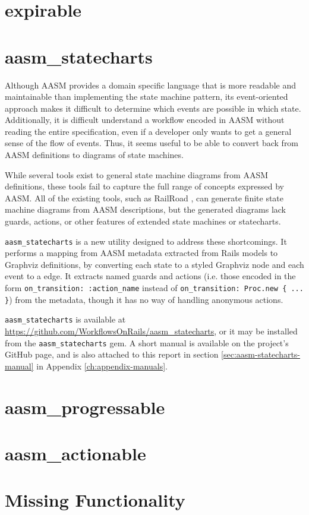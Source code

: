 \documentclass[document.tex]{subfiles}
\begin{document}
\FloatBarrier


\section {expirable}


\section {aasm\_statecharts}

Although AASM provides a domain specific language that is more readable and maintainable than implementing the state machine pattern, its event-oriented approach makes it difficult to determine which events are possible in which state. Additionally, it is difficult understand a workflow encoded in AASM without reading the entire specification, even if a developer only wants to get a general sense of the flow of events. Thus, it seems useful to be able to convert back from AASM definitions to diagrams of state machines.

While several tools exist to general state machine diagrams from AASM definitions, these tools fail to capture the full range of concepts expressed by AASM. All of the existing tools, such as RailRoad \cite{railroad}, can generate finite state machine diagrams from AASM descriptions, but the generated diagrams lack guards, actions, or other features of extended state machines or statecharts.

\verb!aasm_statecharts! is a new utility designed to address these shortcomings. It performs a mapping from AASM metadata extracted from Rails models to Graphviz \cite{graphviz} definitions, by converting each state to a styled Graphviz node and each event to a edge. It extracts named guards and actions (i.e. those encoded in the form \verb!on_transition: :action_name! instead of \verb!on_transition: Proc.new { ... }!) from the metadata, though it has no way of handling anonymous actions.


\verb!aasm_statecharts! is available at \url{https://github.com/WorkflowsOnRails/aasm_statecharts}, or it may be installed from the \verb!aasm_statecharts! gem.
A short manual is available on the project's GitHub page, and is also attached to this report in section \ref{sec:aasm-statecharts-manual} in Appendix \ref{ch:appendix-manuals}.


\section {aasm\_progressable}


\section {aasm\_actionable}


\section {Missing Functionality}
\end{document}
